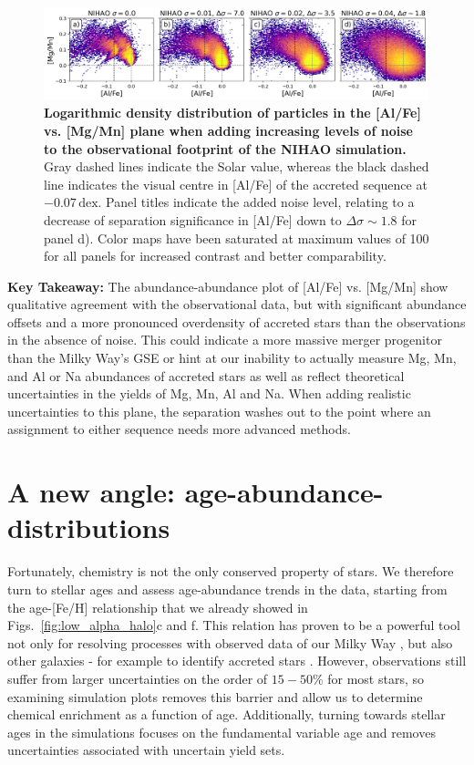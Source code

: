 \documentclass[fleqn,usenatbib]{mnras}
\begin{document}
\begin{figure}
	\includegraphics[width=0.995\textwidth]{figures/mgmn_alfe_with_noise.png}
    \caption{
    \textbf{Logarithmic density distribution of particles in the [Al/Fe] vs. [Mg/Mn] plane when adding increasing levels of noise to the observational footprint of the NIHAO simulation.} Gray dashed lines indicate the Solar value, whereas the black dashed line indicates the visual centre in  [Al/Fe] of the accreted sequence at $-0.07\,\mathrm{dex}$. Panel titles indicate the added noise level, relating to a decrease of separation significance in [Al/Fe] down to $\Delta \sigma \sim 1.8$ for panel d). Color maps have been saturated at maximum values of 100 for all panels for increased contrast and better comparability.
    }
    \label{fig:mgmn_alfe_with_noise}
\end{figure}

\textbf{Key Takeaway:} The abundance-abundance plot of [Al/Fe] vs. [Mg/Mn] show qualitative agreement with the observational data, but with significant abundance offsets and a more pronounced overdensity of accreted stars than the observations in the absence of noise. This could indicate a more massive merger progenitor than the Milky Way's GSE or hint at our inability to actually measure Mg, Mn, and Al or Na abundances of accreted stars as well as reflect theoretical uncertainties in the yields of Mg, Mn, Al and Na. When adding realistic uncertainties to this plane, the separation washes out to the point where an assignment to either sequence needs more advanced methods.

\section{A new angle: age-abundance-distributions}\label{sec:Age-abundance}

Fortunately, chemistry is not the only conserved property of stars. We therefore turn to stellar ages and assess age-abundance trends in the data, starting from the age-[Fe/H] relationship that we already showed in Figs.~\ref{fig:low_alpha_halo}c and f. This relation has proven to be a powerful tool not only for resolving processes with observed data of our Milky Way \citep[e.g.][]{Twarog1980, Edvardsson1993, Nordstroem2004, Casagrande2011, Feuillet2019, Xiang2022}, but also other galaxies - for example to identify accreted stars \citep[e.g.][]{Pinna2019b, Martig2021}. However, observations still suffer from larger uncertainties on the order of $15-50\%$ for most stars, so examining simulation plots removes this barrier and allow us to determine chemical enrichment as a function of age. Additionally, turning towards stellar ages in the simulations focuses on the fundamental variable age and removes uncertainties associated with uncertain yield sets.
\end{document}
